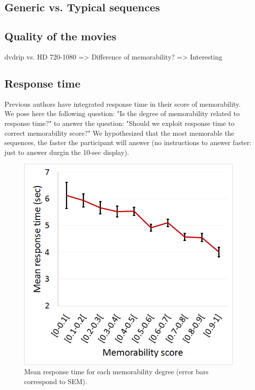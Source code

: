 \documentclass[sigconf]{acmart}
\begin{document}
\subsection{Generic vs. Typical sequences}

\subsection{Quality of the movies}
dvdrip vs. HD 720-1080 => Difference of memorability? => Interesting

\subsection{Response time}
Previous authors have integrated response time in their score of memorability. We pose here the following question: "Is the degree of memorability related to response time?" to answer the question: "Should we exploit response time to correct memorability score?" We hypothesized that the most memorable the sequences, the faster the participant will answer (no instructions to answer faster: just to answer durgin the 10-sec display).

\begin{figure}[!htbp]
	\centering
	\includegraphics[width=\columnwidth]{figures/Response_time_vs_Memorability.png}
	\caption{\label{fig:response_time_vs_memorability}Mean response time for each memorability degree (error bars correspond to SEM).}
\end{figure}
\end{document}
